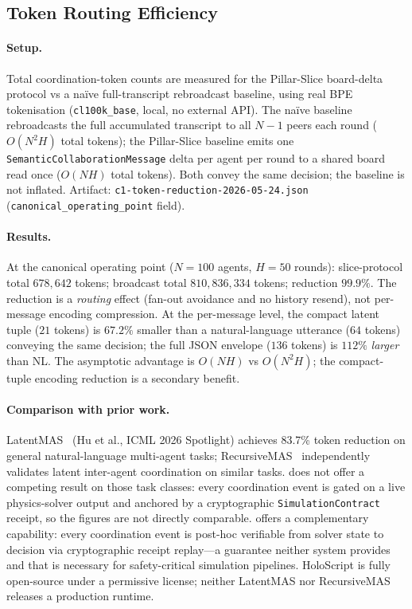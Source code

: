 \subsection{Token Routing Efficiency}
\label{sec:eval-token-routing}

\paragraph{Setup.}
Total coordination-token counts are measured for the Pillar-Slice board-delta
protocol vs a na\"{i}ve full-transcript rebroadcast baseline, using real BPE
tokenisation (\texttt{cl100k\_base}, local, no external API).  The na\"{i}ve
baseline rebroadcasts the full accumulated transcript to all $N - 1$ peers each
round ($O(N^2 H)$ total tokens); the Pillar-Slice baseline emits one
\texttt{SemanticCollaborationMessage} delta per agent per round to a shared
board read once ($O(NH)$ total tokens).  Both convey the same decision;
the baseline is not inflated.
Artifact: \texttt{c1-token-reduction-2026-05-24.json}
(\texttt{canonical\_operating\_point} field).

\paragraph{Results.}
At the canonical operating point ($N = 100$ agents, $H = 50$ rounds):
slice-protocol total $678{,}642$ tokens; broadcast total $810{,}836{,}334$
tokens; reduction $99.9\%$.  The reduction is a \emph{routing} effect
(fan-out avoidance and no history resend), not per-message encoding
compression.  At the per-message level, the compact latent tuple ($21$ tokens)
is $67.2\%$ smaller than a natural-language utterance ($64$ tokens) conveying
the same decision; the full JSON envelope ($136$ tokens) is $112\%$
\emph{larger} than NL.  The asymptotic advantage is $O(NH)$ vs $O(N^2H)$;
the compact-tuple encoding reduction is a secondary benefit.

\paragraph{Comparison with prior work.}
\label{sec:eval-latentmas-comparison}
LatentMAS~\cite{latentmas2025} (Hu et al., ICML 2026 Spotlight) achieves
83.7\% token reduction on general natural-language multi-agent tasks;
RecursiveMAS~\cite{recursivemas2026} independently validates latent
inter-agent coordination on similar tasks.  \PillarSlice{} does not offer a
competing result on those task classes: every coordination event is gated on a
live physics-solver output and anchored by a cryptographic
\texttt{SimulationContract} receipt, so the figures are not directly
comparable.  \PillarSlice{} offers a complementary capability: every
coordination event is post-hoc verifiable from solver state to decision via
cryptographic receipt replay---a guarantee neither system provides and that is
necessary for safety-critical simulation pipelines.  HoloScript is fully
open-source under a permissive license; neither LatentMAS nor RecursiveMAS
releases a production runtime.

